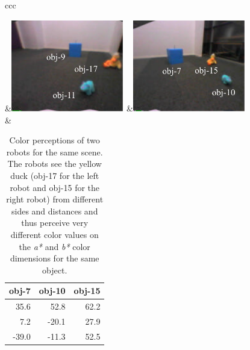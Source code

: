 \begin{table}[htbp]
  \centering\small
\begin{tabular}{ccc}
 \lsptoprule 

    &\includegraphics[width=0.37\textwidth]{chap11/figs/grounding-scene-a}
	&\includegraphics[width=0.37\textwidth]{chap11/figs/grounding-scene-b}\\
&
  \begin{tabular}{rrr}
 obj-7 & obj-10 & obj-15 \\
\midrule
      35.6 & 52.8 & 62.2 \\
      7.2 & -20.1 & 27.9 \\
      -39.0 & -11.3 & 52.5 \\ 
  \end{tabular} \\
\lspbottomrule
\end{tabular}
  \caption[Comparison between the color perceptions of two robots for
  an example scene]{Color perceptions of two
    robots for the same scene. The robots see the yellow duck
    (obj-17 for the left robot and obj-15 for the right robot) from
    different sides and distances and thus perceive very different color values on 
    the \emph{a*} and \emph{b*} color dimensions for the same object.}
  \label{f:scene-example}
\end{table}

